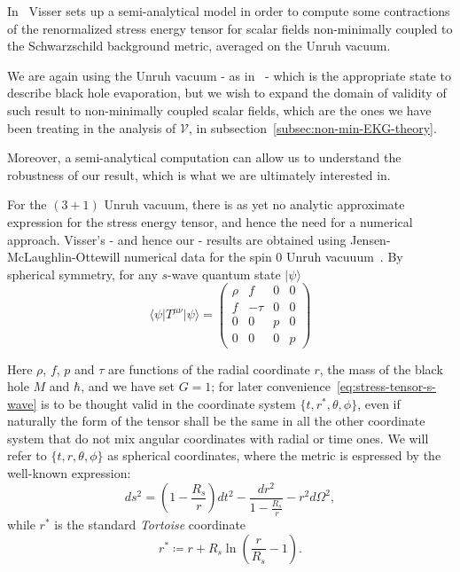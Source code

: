In~\cite[]{visser1997gravitational} Visser sets up a semi-analytical model in order to compute some contractions of the renormalized stress energy tensor for scalar fields non-minimally coupled to the Schwarzschild background metric, averaged on the Unruh vacuum.

We are again using the Unruh vacuum - as in~\cite[]{levi2016versatile} - which is the appropriate state to describe black hole evaporation, but we wish to expand the domain of validity of such result to non-minimally coupled scalar fields, which are the ones we have been treating in the analysis of \(\mathcal{V}\), in subsection~\ref{subsec:non-min-EKG-theory}.

Moreover, a semi-analytical computation can allow us to understand the robustness of our result, which is what we are ultimately interested in.

For the \((3 + 1)\) Unruh vacuum, there is as yet no analytic approximate expression for the stress energy tensor, and hence the need for a numerical approach. Visser's - and hence our - results are obtained using Jensen-McLaughlin-Ottewill numerical data for the spin \(0\) Unruh vacuuum~\cite[]{jensen1991renormalized}. By spherical symmetry, for any \(s\)-wave quantum state \(\vert \psi\rangle\) 
\begin{equation}
    \label{eq:stress-tensor-s-wave}
    \langle\psi\vert T^{\mu\nu}\vert\psi\rangle = \begin{pmatrix}
        \rho & f & 0 & 0 \\
        f & -\tau & 0 & 0 \\
        0 & 0 & p & 0 \\
        0 & 0 & 0 & p
    \end{pmatrix}
\end{equation}

Here \(\rho\), \(f\), \(p\) and  \(\tau\) are functions of the radial coordinate \(r\), the mass of the black hole \(M\) and \(\hbar\), and we have set \(G = 1\); for later convenience~\eqref{eq:stress-tensor-s-wave} is to be thought valid in the coordinate system \(\{t, r^*, \theta, \phi\}\), even if naturally the form of the tensor shall be the same in all the other coordinate system that do not mix angular coordinates with radial or time ones. We will refer to \(\{t, r, \theta, \phi\}\) as spherical coordinates, where the metric is espressed by the well-known expression:
\[
ds^2 =  \left(1 - \frac{R_s}{r}\right)dt^2  - \frac{dr^2}{1 - \frac{R_s}{r}} - r^2d\Omega^2,
\]
while \(r^*\) is the standard \emph{Tortoise} coordinate
\[
r^* \coloneqq r + R_s\ln\left(\frac{r}{R_s} - 1\right).    
\]

